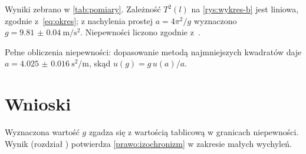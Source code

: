 \documentclass[a4paper, polish, 11pt]{scrartcl}
\begin{document}
Wyniki zebrano w \cref{tab:pomiary}. Zależność $T^2(l)$ na \cref{rys:wykres-b} jest liniowa, zgodnie z~\cref{eq:okres}; z nachylenia prostej $a = 4\pi^2/g$ wyznaczono $g = \qty{9.81(4)}{\metre\per\second\squared}$. Niepewności liczono zgodnie z~\cite{taylor}.

\begin{extended}
\begin{remark*}
Pełne obliczenia niepewności: dopasowanie metodą najmniejszych kwadratów daje $a = \qty{4.025(16)}{\second\squared\per\metre}$, skąd $u(g) = g\,u(a)/a$.
\end{remark*}
\end{extended}

\section{Wnioski}\label{sec:wnioski}

Wyznaczona wartość $g$ zgadza się z wartością tablicową w granicach niepewności. Wynik (rozdział ) potwierdza \cref{prawo:izochronizm} w zakresie małych wychyleń.

\printbibliography
\end{document}
